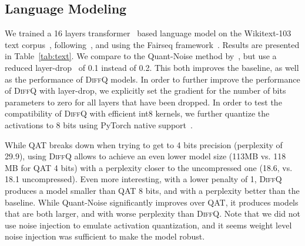 \documentclass{article}
\newcommand{\diffq}{\textsc{DiffQ}\xspace}
\begin{document}
\vspace{-0.1cm}
\subsection{Language Modeling}
\vspace{-0.1cm}

We trained a 16 layers transformer~\citep{vaswani2017attention} based language model on the Wikitext-103 text corpus~\citep{merity2016pointer},
following~\citet{baevski2018adaptive},
 and using the Fairseq framework~\citep{ott2019fairseq}. 
 Results are presented in Table~\ref{tab:text}.
 We compare to the Quant-Noise method by~\citet{fan2020training}, but use a reduced
 layer-drop~\citep{fan2019reducing} of 0.1 instead of 0.2. This both improves the baseline, as well as the performance of \diffq models. In order to further improve the performance of \diffq with layer-drop, we explicitly set the gradient for the number of bits parameters to zero for all layers that have been dropped.
 In order to test the compatibility of \diffq with efficient int8 kernels, we further quantize the activations to 8 bits using PyTorch native support~\citep{Pytorch}.
 
 While QAT breaks down when trying to get
 to 4 bits precision (perplexity of 29.9), using \diffq allows to achieve an even lower model size (113MB vs. 118 MB 
 for QAT 4 bits) with a perplexity closer to the uncompressed one (18.6, vs.
 18.1 uncompressed). Even more interesting, with a lower penalty of 1, \diffq
 produces a model smaller than QAT 8 bits, and with a perplexity 
 better than the baseline.
While Quant-Noise significantly improves over QAT, it produces models that
are both larger, and with worse perplexity than \diffq.
Note that we did not use noise injection to emulate activation quantization, and it seems weight level noise injection was sufficient to make the model robust.
 
\end{document}
